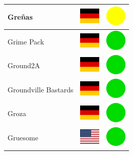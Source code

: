 \documentclass[12pt, a4paper, twoside]{report}
\begin{document}
\begin{center}
\begin{longtable}{|p{5cm}|p{2cm}|p{2cm}|}
 Greñas                                                     & \includegraphics[width=1cm]{../img/flags/de} &   \includegraphics[width=1cm]{../likes/m} \\ \hline
 Grime Pack                                                 & \includegraphics[width=1cm]{../img/flags/de} &   \includegraphics[width=1cm]{../likes/y} \\ \hline
 Ground2A                                                   & \includegraphics[width=1cm]{../img/flags/de} &   \includegraphics[width=1cm]{../likes/y} \\ \hline
 Groundville Bastards                                       & \includegraphics[width=1cm]{../img/flags/de} &   \includegraphics[width=1cm]{../likes/y} \\ \hline
 Groza                                                      & \includegraphics[width=1cm]{../img/flags/de} &   \includegraphics[width=1cm]{../likes/y} \\ \hline
 Gruesome                                                   & \includegraphics[width=1cm]{../img/flags/us} &   \includegraphics[width=1cm]{../likes/y} \\ \hline

\end{longtable}
\end{center}
\end{document}
